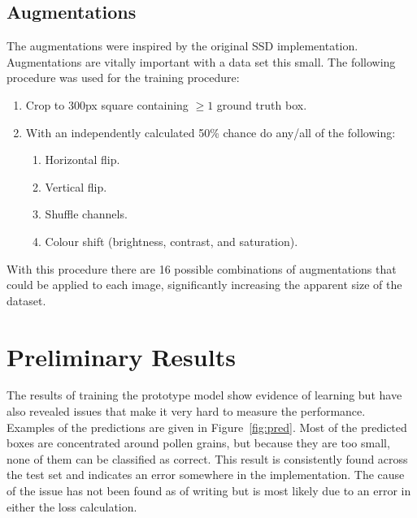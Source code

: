 \subsection*{Augmentations}
The augmentations were inspired by the original SSD implementation.
Augmentations are vitally important with a data set this small.
The following procedure was used for the training procedure:
\begin{enumerate}
  \item Crop to 300px square containing \( \geq 1 \) ground truth box.
  \item With an independently calculated 50\% chance do any/all of the following:
  \begin{enumerate}
  \item Horizontal flip.
  \item Vertical flip.
  \item Shuffle channels.
  \item Colour shift (brightness, contrast, and saturation).
  \end{enumerate}
\end{enumerate}

With this procedure there are 16 possible combinations of augmentations that could be applied to each image, significantly increasing the apparent size of the dataset.

\section*{Preliminary Results}
The results of training the prototype model show evidence of learning but have also revealed issues that make it very hard to measure the performance.
Examples of the predictions are given in Figure~\ref{fig:pred}.
Most of the predicted boxes are concentrated around pollen grains, but because they are too small, none of them can be classified as correct.
This result is consistently found across the test set and indicates an error somewhere in the implementation.
The cause of the issue has not been found as of writing but is most likely due to an error in either the loss calculation.

